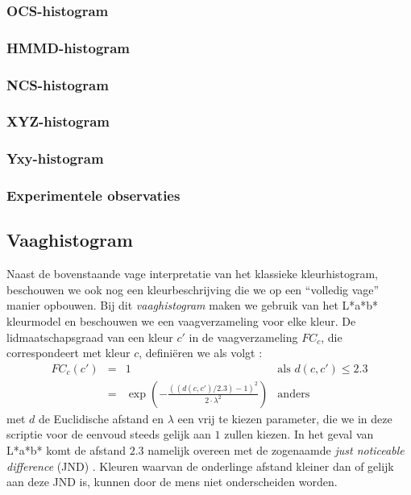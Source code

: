 \subsubsection{OCS-histogram}

\subsubsection{HMMD-histogram}

\subsubsection{NCS-histogram}

\subsubsection{XYZ-histogram}

\subsubsection{Yxy-histogram}


\subsubsection{Experimentele observaties}


\subsection{Vaaghistogram}

Naast de bovenstaande vage interpretatie van het klassieke kleurhistogram, beschouwen we
ook nog een kleurbeschrijving die we op een ``volledig vage'' manier opbouwen. Bij dit
\emph{vaaghistogram} maken we gebruik van het L*a*b* kleurmodel en beschouwen we een 
vaagverzameling voor elke kleur. 
De lidmaatschapsgraad van een kleur $c'$ in de vaagverzameling 
$FC_c$, die correspondeert met kleur $c$, defini\"eren we als volgt \cite{vertan:fuzzy_histograms}: 
$$
\begin{array}{rcll}
FC_c(c') & = & 1 & \textrm{als } d(c,c') \leq 2.3 \\
		 & = & \exp \left( - \frac{\left((d(c,c') / 2.3) - 1\right)^2}{2 \cdot \lambda^2} \right) & \textrm{anders}
\end{array}
$$  
met $d$ de Euclidische afstand en $\lambda$ een vrij te kiezen parameter, die we in deze scriptie
voor de eenvoud steeds gelijk aan $1$ zullen kiezen. In het geval van L*a*b* 
komt de afstand $2.3$ namelijk overeen met de zogenaamde \emph{just noticeable difference} (JND)
\cite{sharma:digital_color_imaging}. 
Kleuren waarvan de onderlinge afstand kleiner dan of gelijk aan deze JND is, kunnen door de mens 
niet onderscheiden worden.

